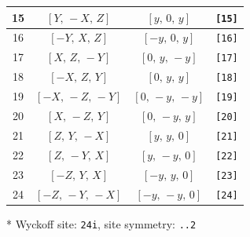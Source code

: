 \documentclass[fleqn,8pt]{jsarticle}
\begin{document}
\begin{longtable}{cccc}
15 & $\left[ Y,\, - X,\, Z \right]$ & $\left[ y,\, 0,\, y \right]$ & {\tt [15]} \\ \hline
16 & $\left[ - Y,\, X,\, Z \right]$ & $\left[ - y,\, 0,\, y \right]$ & {\tt [16]} \\ \hline
17 & $\left[ X,\, Z,\, - Y \right]$ & $\left[ 0,\, y,\, - y \right]$ & {\tt [17]} \\ \hline
18 & $\left[ - X,\, Z,\, Y \right]$ & $\left[ 0,\, y,\, y \right]$ & {\tt [18]} \\ \hline
19 & $\left[ - X,\, - Z,\, - Y \right]$ & $\left[ 0,\, - y,\, - y \right]$ & {\tt [19]} \\ \hline
20 & $\left[ X,\, - Z,\, Y \right]$ & $\left[ 0,\, - y,\, y \right]$ & {\tt [20]} \\ \hline
21 & $\left[ Z,\, Y,\, - X \right]$ & $\left[ y,\, y,\, 0 \right]$ & {\tt [21]} \\ \hline
22 & $\left[ Z,\, - Y,\, X \right]$ & $\left[ y,\, - y,\, 0 \right]$ & {\tt [22]} \\ \hline
23 & $\left[ - Z,\, Y,\, X \right]$ & $\left[ - y,\, y,\, 0 \right]$ & {\tt [23]} \\ \hline
24 & $\left[ - Z,\, - Y,\, - X \right]$ & $\left[ - y,\, - y,\, 0 \right]$ & {\tt [24]} \\
\end{longtable}
* Wyckoff site: {\tt 24i}, site symmetry: {\tt ..2}
\renewcommand{\arraystretch}{1.2}
\end{document}
